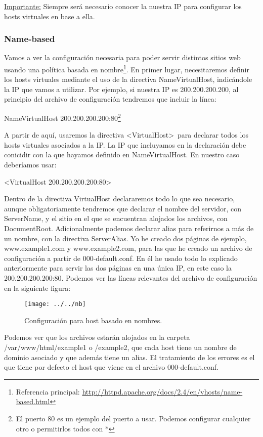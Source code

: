 \documentclass[a4paper, 10pt]{article} %
\begin{document}
\underline{Importante:} Siempre será necesario conocer la nuestra IP para configurar los hosts virtuales en base a ella. 

\subsubsection{Name-based}

Vamos a ver la configuración necesaria para poder servir distintos sitios web usando una política basada en nombre\footnote{Referencia principal: \url{http://httpd.apache.org/docs/2.4/en/vhosts/name-based.html}}. En primer lugar, necesitaremos definir los hosts virtuales mediante el uso de la directiva NameVirtualHost, indicándole la IP que vamos a utilizar. Por ejemplo, si nuestra IP es 200.200.200.200, al principio del archivo de configuración tendremos que incluir la línea:

NameVirtualHost 200.200.200.200:80\footnote{El puerto 80 es un ejemplo del puerto a usar. Podemos configurar cualquier otro o permitirlos todos con *}

A partir de aquí, usaremos la directiva <VirtualHost>\ para declarar todos los hosts virtuales asociados a la IP. La IP que incluyamos en la declaración debe conicidir con la que hayamos definido en NameVirtualHost. En nuestro caso deberíamos usar:

<VirtualHost 200.200.200.200:80>

Dentro de la directiva VirtualHost declararemos todo lo que sea necesario, aunque obligatoriamente tendremos que declarar el nombre del servidor, con ServerName, y el sitio en el que se encuentran alojados los archivos, con DocumentRoot. Adicionalmente podemos declarar alias para referirnos a más de un nombre, con la directiva ServerAlias. Yo he creado dos páginas de ejemplo, www.example1.com y www.example2.com, para las que he creado un archivo de configuración a partir de 000-default.conf. En él he usado todo lo explicado anteriormente para servir las dos páginas en una única IP, en este caso la 200.200.200.200:80. Podemos ver las líneas relevantes del archivo de configuración en la siguiente figura: 


\begin{figure}[htpb]
\centering
\texttt{[image: ../../nb]}
\caption{Configuración para host basado en nombres.}
\end{figure}

Podemos ver que los archivos estarán alojados en la carpeta /var/www/html/example1 o /example2, que cada host tiene un nombre de dominio asociado y que además tiene un alias. El tratamiento de los errores es el que tiene por defecto el host que viene en el archivo 000-default.conf.
\end{document}
